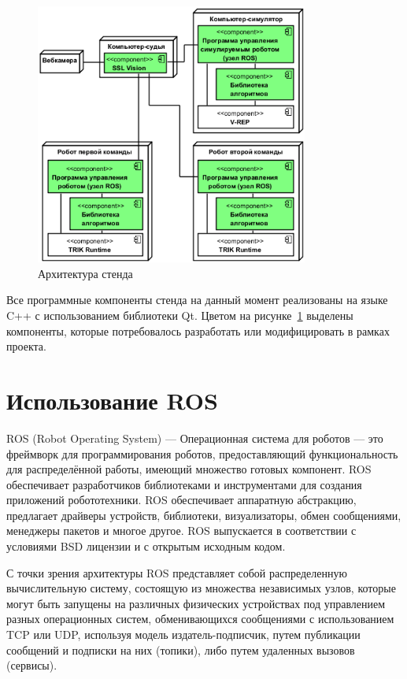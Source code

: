 \documentclass{spisok-article}
\begin{document}
\begin{figure}[ht]
    \centering
    \includegraphics[width=0.8\textwidth]{architecture.png}
    \caption{Архитектура стенда}
    \label{image:architecture}
\end{figure}

Все программные компоненты стенда на данный момент реализованы на языке C++ с использованием библиотеки Qt. Цветом на рисунке~\ref{image:architecture} выделены компоненты, которые потребовалось разработать или модифицировать в рамках проекта.

\section{Использование ROS}

ROS (Robot Operating System) --- Операционная система для роботов --- это фреймворк для программирования роботов, предоставляющий функциональность для распределённой работы, имеющий множество готовых компонент. ROS обеспечивает разработчиков библиотеками и инструментами для создания приложений робототехники. ROS обеспечивает аппаратную абстракцию, предлагает драйверы устройств, библиотеки, визуализаторы, обмен сообщениями, менеджеры пакетов и многое другое. ROS выпускается в соответствии с условиями BSD лицензии и с открытым исходным кодом.

С точки зрения архитектуры ROS представляет собой распределенную вычислительную систему, состоящую из множества независимых узлов, которые могут быть запущены на различных физических устройствах под управлением разных операционных систем, обменивающихся сообщениями с использованием TCP или UDP, используя модель издатель-подписчик, путем публикации сообщений и подписки на них (топики), либо путем удаленных вызовов (сервисы).
\end{document}
